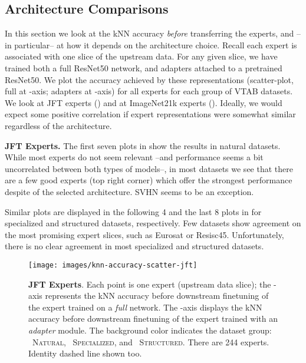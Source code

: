 \documentclass{article}
\newcommand{\naturalsym}{{\protect\scalebox{1.5}{\color{naturalcolor!50}}}}
\newcommand{\specializedsym}{{\protect\scalebox{1.5}{\color{specializedcolor!50}}}}
\newcommand{\structuredsym}{{\protect\scalebox{1.5}{\color{structuredcolor!50}}}}
\begin{document}
\subsection{Architecture Comparisons}
\label{app:arch}




In this section we look at the kNN accuracy \emph{before} transferring the experts, and --in particular-- at how it depends on the architecture choice.
Recall each expert is associated with one slice of the upstream data.
For any given slice, we have trained both a full ResNet50 network, and adapters attached to a pretrained ResNet50.
We plot the accuracy achieved by these representations (scatter-plot, full at -axis; adapters at -axis) for all experts for each group of VTAB datasets.
We look at JFT experts () and at ImageNet21k experts ().
Ideally, we would expect some positive correlation if expert representations were somewhat similar regardless of the architecture.

\textbf{JFT Experts.}
The first seven plots in  show the results in natural datasets.
While most experts do not seem relevant --and performance seems a bit uncorrelated between both types of models--, in most datasets we see that there are a few good experts (top right corner) which offer the strongest performance despite of the selected architecture.
SVHN seems to be an exception.

Similar plots are displayed in the following 4 and the last 8 plots in  for specialized and structured datasets, respectively.
Few datasets show agreement on the most promising expert slices, such as Eurosat or Resisc45.
Unfortunately, there is no clear agreement in most specialized and structured datasets.

\begin{figure}[htb]
\texttt{[image: images/knn-accuracy-scatter-jft]}
\caption{\textbf{JFT Experts}.
Each point is one expert (upstream data slice); the -axis represents the kNN accuracy before downstream finetuning of the expert trained on a \emph{full} network. The -axis displays the kNN accuracy before downstream finetuning of the expert trained with an \emph{adapter} module.
The background color indicates the dataset group: 
{\naturalsym~\textsc{Natural}}, 
{\specializedsym~\textsc{Specialized}}, and
{\structuredsym~\textsc{Structured}}.
There are 244 experts.
Identity dashed line shown too.}
\label{fig:app_jft_per_expert_knn}
\end{figure}
\end{document}
